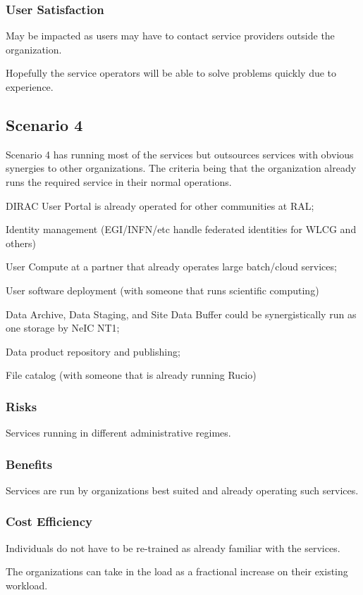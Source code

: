 \documentclass[12pt,a4paper]{article}
\begin{document}
\subsubsection*{User Satisfaction}
\bitm
\item May be impacted as users may have to contact service providers outside the \EC organization.
  \item Hopefully the service operators will be able to solve problems quickly due to experience.
\eitm

\subsection{Scenario 4}
\label{ssec:scen4}

Scenario 4 has \EC running most of the services but outsources services with
obvious synergies to other organizations.
The criteria being that the organization already runs the required service in their normal
operations.
\bitm
\item DIRAC User Portal is already operated for other communities at RAL;
\item Identity management (EGI/INFN/etc handle federated identities for WLCG and others)
\item User Compute at a partner that already operates large batch/cloud services;
\item User software deployment (with someone that runs scientific computing)
\item Data Archive, Data Staging, and Site Data Buffer could be synergistically run as one storage by NeIC NT1;
\item Data product repository and publishing;
\item File catalog (with someone that is already running Rucio)
  \eitm
  
\subsubsection*{Risks}
\bitm
\item Services running in different administrative regimes.
\eitm

\subsubsection*{Benefits}
\bitm
\item Services are run by organizations best suited and already operating such services.
\eitm

\subsubsection*{Cost Efficiency}
\bitm
\item Individuals do not have to be re-trained as already familiar with the services.
\item The organizations can take in the \ED load as a fractional increase on their existing workload.
\eitm
\end{document}
